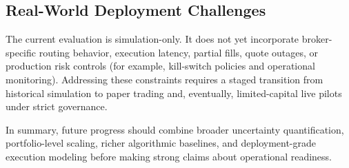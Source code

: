 \subsection{Real-World Deployment Challenges}
The current evaluation is simulation-only. It does not yet incorporate broker-specific routing behavior, execution latency, partial fills, quote outages, or production risk controls (for example, kill-switch policies and operational monitoring). Addressing these constraints requires a staged transition from historical simulation to paper trading and, eventually, limited-capital live pilots under strict governance.

In summary, future progress should combine broader uncertainty quantification, portfolio-level scaling, richer algorithmic baselines, and deployment-grade execution modeling before making strong claims about operational readiness.